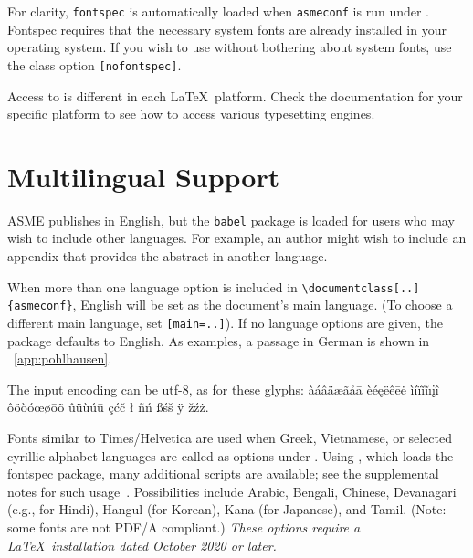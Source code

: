 \documentclass[captionpatch,colorlinks,upint,subscriptcorrection,varvw,german]{asmeconf}
\begin{document}
For clarity, \texttt{fontspec} is automatically loaded when \texttt{asmeconf} is run under . Fontspec requires that the necessary system fonts are already installed in your operating system.  If you wish to use  without bothering about system fonts, use the class option \texttt{[nofontspec]}.

Access to  is different in each \LaTeX\ platform.  Check the documentation for your specific platform to see how to access various typesetting engines.

\section{Multilingual Support}\label{appendix:c}

ASME publishes in English, but the \texttt{babel} package is loaded for
users who may wish to include other languages. For example, an author might wish to include an appendix that provides the
abstract in another language.

When more than one language option is included in \verb|\documentclass[..]{asmeconf}|, English will be
set as the document's main language. (To choose a different main language, set \texttt{[main=..]}).
If no language options are given, the package defaults to English.  As examples, a passage in German is
shown in  \appendixname~\ref{app:pohlhausen}.

The input encoding can be utf-8, as for these glyphs:
%
àáâäæãåā èéęëêēė ìíïǐĩıįî ôöòóœøōõ ûüùúū çćč ł ñń ßśš ÿ žźż.

Fonts similar to Times/Helvetica are used when Greek, Vietnamese, or selected cyrillic-alphabet languages are called as options under {\upshape{}}. Using {\upshape{}}, which loads the fontspec package, many additional scripts are available; see the supplemental notes for such usage~\cite{lienhard2021}. Possibilities include Arabic, Bengali, Chinese, Devanagari (e.g., for Hindi), Hangul (for Korean), Kana (for Japanese), and Tamil. (Note: some fonts are not PDF/A compliant.) \textit{These options require a \LaTeX\ installation dated October 2020 or later.}
\end{document}
